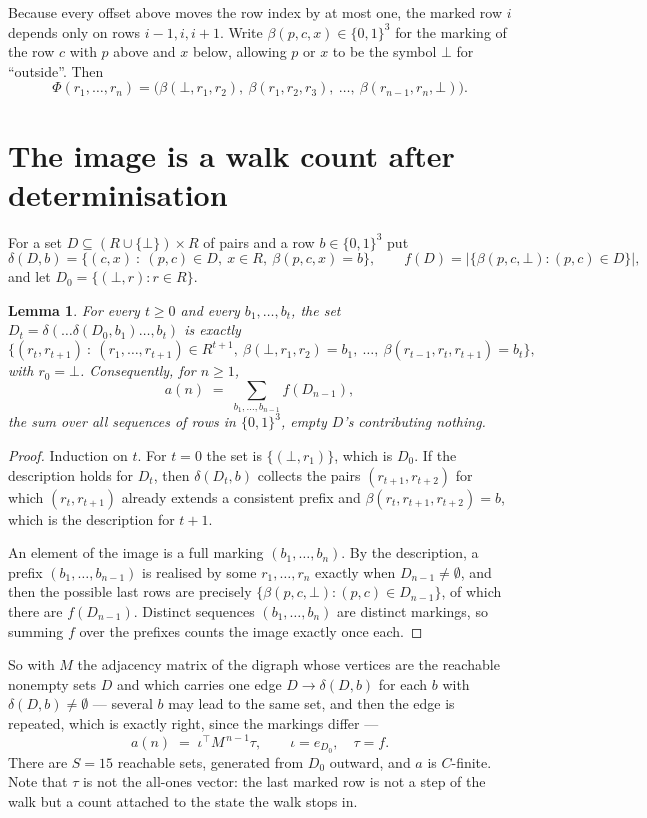 \documentclass[11pt,a4paper]{article}
\theoremstyle{plain}
\newtheorem{lemma}[theorem]{Lemma}
\theoremstyle{definition}
\begin{document}
Because every offset above moves the row index by at most one, the marked row $i$ depends only
on rows $i-1,i,i+1$. Write $\beta(p,c,x)\in\{0,1\}^{3}$ for the marking of the row $c$
with $p$ above and $x$ below, allowing $p$ or $x$ to be the symbol $\bot$ for ``outside''.
Then
\[
\Phi(r_1,\dots,r_n)=\bigl(\beta(\bot,r_1,r_2),\ \beta(r_1,r_2,r_3),\ \dots,\
\beta(r_{n-1},r_n,\bot)\bigr).
\]

\section{The image is a walk count after determinisation}

For a set $D\subseteq(R\cup\{\bot\})\times R$ of pairs and a row $b\in\{0,1\}^{3}$ put
\[
\delta(D,b)=\{(c,x)\ :\ (p,c)\in D,\ x\in R,\ \beta(p,c,x)=b\},\qquad
f(D)=\bigl|\{\beta(p,c,\bot):(p,c)\in D\}\bigr| ,
\]
and let $D_0=\{(\bot,r):r\in R\}$.

\begin{lemma}\label{lem:det}
For every $t\ge0$ and every $b_1,\dots,b_t$, the set
$D_t=\delta(\dots\delta(D_0,b_1)\dots,b_t)$ is exactly
\[
\{(r_t,r_{t+1})\ :\ (r_1,\dots,r_{t+1})\in R^{t+1},\ \beta(\bot,r_1,r_2)=b_1,\ \dots,\
\beta(r_{t-1},r_t,r_{t+1})=b_t\} ,
\]
with $r_0=\bot$. Consequently, for $n\ge1$,
\[
a(n)\;=\;\sum_{b_1,\dots,b_{n-1}}f(D_{n-1}),
\]
the sum over all sequences of rows in $\{0,1\}^{3}$, empty $D$'s contributing nothing.
\end{lemma}

\begin{proof}
Induction on $t$. For $t=0$ the set is $\{(\bot,r_1)\}$, which is $D_0$. If the description
holds for $D_t$, then $\delta(D_t,b)$ collects the pairs $(r_{t+1},r_{t+2})$ for which
$(r_t,r_{t+1})$ already extends a consistent prefix and
$\beta(r_t,r_{t+1},r_{t+2})=b$, which is the description for $t+1$.

An element of the image is a full marking $(b_1,\dots,b_n)$. By the description, a prefix
$(b_1,\dots,b_{n-1})$ is realised by some $r_1,\dots,r_n$ exactly when $D_{n-1}\neq
\emptyset$, and then the possible last rows are precisely
$\{\beta(p,c,\bot):(p,c)\in D_{n-1}\}$, of which there are $f(D_{n-1})$. Distinct
sequences $(b_1,\dots,b_n)$ are distinct markings, so summing $f$ over the prefixes counts the
image exactly once each.
\end{proof}

So with $M$ the adjacency matrix of the digraph whose vertices are the reachable nonempty sets
$D$ and which carries one edge $D\to\delta(D,b)$ for each $b$ with $\delta(D,b)\neq\emptyset$
--- several $b$ may lead to the same set, and then the edge is repeated, which is exactly
right, since the markings differ ---
\[
a(n)\;=\;\iota^{\!\top}M^{\,n-1}\tau,\qquad \iota=e_{D_0},\quad \tau=f .
\]
There are $S=15$ reachable sets, generated from $D_0$ outward, and $a$ is $C$-finite. Note
that $\tau$ is not the all-ones vector: the last marked row is not a step of the walk but a
count attached to the state the walk stops in.
\end{document}
